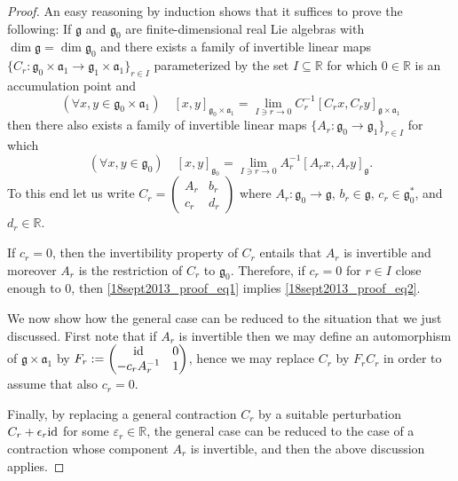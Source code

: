 \documentclass[
reqno]{amsart}
\begin{document}
\begin{proof}
An easy reasoning by induction shows that it suffices to prove the following: 
If ${{\mathfrak g}}$ and ${{\mathfrak g}}_0$ are finite-dimensional real Lie algebras 
with $\dim{{\mathfrak g}}=\dim{{\mathfrak g}}_0$ and there exists a family of invertible linear maps 
$\{C_r\colon{{\mathfrak g}}_0\times{{\mathfrak a}}_1\to{{\mathfrak g}}_1\times{{\mathfrak a}}_1\}_{r\in I}$ parameterized 
by the set $I\subseteq{{\mathbb R}}$ for which $0\in{{\mathbb R}}$ is an accumulation point and 
\begin{equation}\label{18sept2013_proof_eq1}
(\forall x,y\in{{\mathfrak g}}_0\times{{\mathfrak a}}_1)\quad  
[x,y]_{{{\mathfrak g}}_0\times{{\mathfrak a}}_1}=\lim\limits_{I\ni r\to 0}C_r^{-1}[C_rx,C_ry]_{{{\mathfrak g}}\times{{\mathfrak a}}_1}
\end{equation}
then  there also exists a family of invertible linear maps 
$\{A_r\colon{{\mathfrak g}}_0\to{{\mathfrak g}}_1\}_{r\in I}$ for which
\begin{equation}\label{18sept2013_proof_eq2}
(\forall x,y\in{{\mathfrak g}}_0)\quad  
[x,y]_{{{\mathfrak g}}_0}=\lim\limits_{I\ni r\to 0}A_r^{-1}[A_rx,A_ry]_{{\mathfrak g}}.
\end{equation}
To this end let us write 
$C_r=\begin{pmatrix}
A_r & b_r \\
c_r & d_r 
\end{pmatrix}$
where $A_r\colon{{\mathfrak g}}_0\to{{\mathfrak g}}$, $b_r\in{{\mathfrak g}}$, $c_r\in{{\mathfrak g}}_0^*$, and $d_r\in{{\mathbb R}}$. 

If $c_r=0$, then the invertibility property of $C_r$ 
entails that $A_r$ is invertible and moreover $A_r$ is the restriction of $C_r$ to ${{\mathfrak g}}_0$. 
Therefore, if $c_r=0$ for $r\in I$ close enough to $0$, then 
\eqref{18sept2013_proof_eq1} implies \eqref{18sept2013_proof_eq2}. 

We now show how the general case can be reduced to the situation that we just discussed. 
First note that  if $A_r$ is invertible then we may define an automorphism of ${{\mathfrak g}}\times{{\mathfrak a}}_1$ 
by 
$F_r:=\begin{pmatrix}
{{\rm id}} & 0 \\
-c_rA_r^{-1} & 1
\end{pmatrix}$, 
hence 
we may replace $C_r$ by $F_rC_r$ in order to assume that also $c_r=0$. 

Finally, by replacing a general contraction $C_r$ by a suitable perturbation 
$C_r+\epsilon_r{{\rm id}}$ for some $\varepsilon_r\in{{\mathbb R}}$, the general case can be reduced 
to the case of a contraction whose component $A_r$ is invertible, 
and then the above discussion applies.   
\end{proof}
\end{document}
